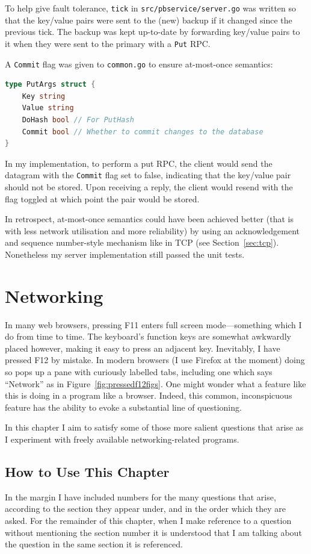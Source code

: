 \documentclass[11pt,a4paper]{report}
\begin{document}
	To help give fault tolerance, \verb|tick| in \verb|src/pbservice/server.go| was written so that the key/value pairs were sent to the (new) backup if it changed since the previous tick. The backup was kept up-to-date by forwarding key/value pairs to it when they were sent to the primary with a \verb|Put| RPC.
	
	A \verb|Commit| flag was given to \verb|common.go| to ensure at-most-once semantics:
	\begin{lstlisting}[language=go]
type PutArgs struct {
	Key string
	Value string
	DoHash bool // For PutHash
	Commit bool // Whether to commit changes to the database
}
	\end{lstlisting}
	In my implementation, to perform a put RPC, the client would send the datagram with the \verb|Commit| flag set to false, indicating that the key/value pair should not be stored. Upon receiving a reply, the client would resend with the flag toggled at which point the pair would be stored.
	
	In retrospect, at-most-once semantics could have been achieved better (that is with less network utilisation and more reliability) by using an acknowledgement and sequence number-style mechanism like in TCP (see Section~\ref{sec:tcp}). Nonetheless my server implementation still passed the unit tests.
	
	\chapter{Networking} \label{ch:networking}
	In many web browsers, pressing F11 enters full screen mode---something which I do from time to time. The keyboard's function keys are somewhat awkwardly placed however, making it easy to press an adjacent key. Inevitably, I have pressed F12 by mistake. In modern browsers (I use Firefox at the moment) doing so pops up a pane with curiously labelled tabs, including one which says ``Network'' as in Figure~\ref{fig:pressedf12figs}. One might wonder what a feature like this is doing in a program like a browser. Indeed, this common, inconspicuous feature has the ability to evoke a substantial line of questioning.
	
	In this chapter I aim to satisfy some of those more salient questions that arise as I experiment with freely available networking-related programs.
	
	\section{How to Use This Chapter}
	In the margin I have included numbers for the many questions that arise, according to the section they appear under, and in the order which they are asked. For the remainder of this chapter, when I make reference to a question without mentioning the section number it is understood that I am talking about the question in the same section it is referenced. 
	
\end{document}
